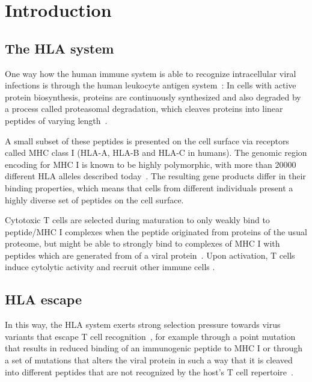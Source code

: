 \documentclass[fleqn,11pt]{SelfArx} %
\affiliation{\textsuperscript{1}\textit{Bioinformatics \& Computational Biophysics, Faculty of Biology, University of Duisburg-Essen, 45117 Essen, Germany}} %
\begin{document}
\flushbottom %

\maketitle %

{
  \hypersetup{linkcolor=black}
  \tableofcontents
}


\section{Introduction}

\subsection{The HLA system}

One way how the human immune system is able to recognize intracellular viral infections is through the human leukocyte antigen system~\cite{Germain1994}: In cells with active protein biosynthesis, proteins are continuously synthesized and also degraded by a process called proteasomal degradation, which cleaves proteins into linear peptides of varying length~\cite{Goldberg2002}.

A small subset of these peptides is presented on the cell surface via receptors called MHC class I (HLA-A, HLA-B and HLA-C in humans). The genomic region encoding for MHC I is known to be highly polymorphic, with more than 20000 different HLA alleles described today~\cite{Robinson2014}. The resulting gene products differ in their binding properties, which means that cells from different individuals present a highly diverse set of peptides on the cell surface.

Cytotoxic T cells are selected during maturation to only weakly bind to peptide/MHC I complexes when the peptide originated from proteins of the usual proteome, but might be able to strongly bind to complexes of MHC I with peptides which are  generated from of a viral protein~\cite{Murata2007}. Upon activation, T cells induce cytolytic activity and recruit other immune cells \nolinebreak\cite{Harty2000}.

\subsection{HLA escape}
In this way, the HLA system exerts strong selection pressure towards virus variants that escape T cell recognition~\cite{Borrow1997}, for example through a point mutation that results in reduced binding of an immunogenic peptide to MHC I or through a set of mutations that alters the viral protein in such a way that it is cleaved into different peptides that are not recognized by the host's T cell repertoire~\cite{Yewdell2002}.
\end{document}
